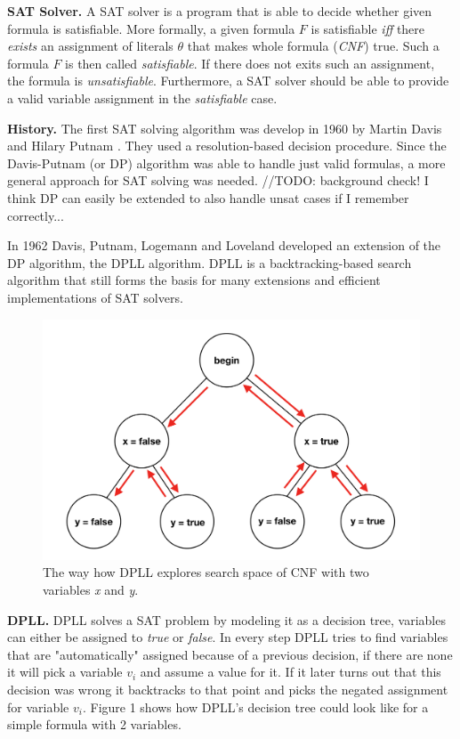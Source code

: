 \documentclass[letterpaper]{article}
\newcommand{\mypar}[1]{{\bf #1.}}
\begin{document}

\mypar{SAT Solver}
A SAT solver is a program that is able to decide whether given formula is satisfiable.
More formally, a given formula $F$ is satisfiable \textit{iff} there \textit{exists} an assignment of literals $\theta$ that makes whole formula (\textit{CNF}) true.
Such a formula $F$ is then called \textit{satisfiable}.
If there does not exits such an assignment, the formula is \textit{unsatisfiable}.
Furthermore, a SAT solver should be able to provide a valid variable assignment in the \textit{satisfiable} case.

\mypar{History}
The first SAT solving algorithm was develop in 1960 by Martin Davis and Hilary Putnam \cite{dp}.
They used a resolution-based decision procedure.
Since the Davis-Putnam (or DP) algorithm was able to handle just valid formulas, a more general approach for SAT solving was needed.
//TODO: background check! I think DP can easily be extended to also handle unsat cases if I remember correctly...

In 1962 Davis, Putnam, Logemann and Loveland developed an extension of the DP algorithm, the DPLL algorithm.
DPLL is a backtracking-based search algorithm that still forms the basis for many extensions and efficient implementations of SAT solvers.
\begin{figure}
	\centering
	\includegraphics[width=\columnwidth]{figures/dpll-branching}
	\caption{The way how DPLL explores search space of CNF with two variables \textit{x} and \textit{y}.
		\label{fig:dpll-branching}}
\end{figure}

\mypar{DPLL}
DPLL solves a SAT problem by modeling it as a decision tree, variables can either be assigned to \textit{true} or \textit{false}.
In every step DPLL tries to find variables that are "automatically" assigned because of a previous decision,
if there are none it will pick a variable $v_i$ and assume a value for it.
If it later turns out that this decision was wrong it backtracks to that point and picks the negated assignment for variable $v_i$.
Figure 1 shows how DPLL's decision tree could look like for a simple formula with 2 variables.
\end{document}
